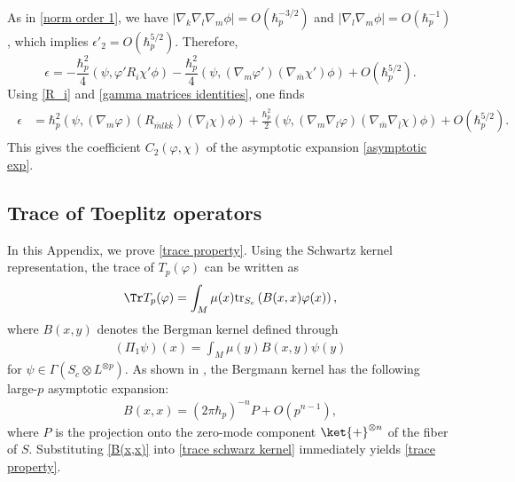 \documentclass[12pt]{article}
\newcommand\eq[1]{\begin{equation}#1\end{equation}}
\newcommand\als[1]{\begin{align}\begin{split}#1\end{split}\end{align}}
\theoremstyle{definition} %
\theoremstyle{plain} %
\theoremstyle{remark} %
\theoremstyle{underline}
\begin{document}
As in \eqref{norm order 1}, we have
$|\nabla_k \nabla_l \nabla_m \phi|= O(\hbar_p^{-3/2})$ and
$|\nabla_l \nabla_m \phi|= O(\hbar_p^{-1})$, which implies
$\epsilon'_2 = O(\hbar_p^{5/2})$.
Therefore,
\eq{
    \epsilon = - \frac{\hbar_p^2}{4}(\psi, \varphi' R_i\chi' \phi) -\frac{\hbar_p^2}{4} (\psi, (\nabla_m \varphi') (\nabla_{\bar m} \chi') \phi) + O(\hbar_p^{5/2}).
}
Using \eqref{R_i} and \eqref{gamma matrices identities}, one finds
\als{
    \epsilon &= \hbar_p^2 (\psi,  (\nabla_m \varphi) ( R_{\bar{m} l k\bar{k}}) (\nabla_{\bar l} \chi) \phi) + \frac{\hbar_p^2}{2} (\psi, (\nabla_m \nabla_l \varphi) (\nabla_{\bar m} \nabla_{\bar l} \chi) \phi) + O(\hbar_p^{5/2}).
}
This gives the coefficient $C_2(\varphi,\chi)$ of the asymptotic expansion
\eqref{asymptotic exp}.




\subsection{Trace of Toeplitz operators}
\label{trace}


In this Appendix, we prove \eqref{trace property}.
Using the Schwartz kernel representation, the trace of $T_p(\varphi)$ can be
written as
\begin{align}
\label{trace schwarz kernel}
\Tr T_p(\varphi) = \int_M \mu(x) \mathrm{tr}_{S_c} \left( B(x,x) \varphi(x)\right),
\end{align}
where $B(x,y)$ denotes the Bergman kernel defined through
\begin{align}
(\Pi_1 \psi) (x) = \int_M \mu(y) B(x,y) \psi(y)
\end{align}
for $\psi \in \Gamma(S_c \otimes L^{\otimes p})$.
As shown in \cite{asym}, the Bergmann kernel has the following large-$p$
asymptotic expansion:
\begin{align}
\label{B(x,x)}
B(x,x) = (2\pi \hbar_p)^{-n} P + O(p^{n-1}),
\end{align}
where $P$ is the projection onto the zero-mode component $\ket{+}^{\otimes n}$ of
the fiber of $S$.
Substituting \eqref{B(x,x)} into \eqref{trace schwarz kernel} immediately yields
\eqref{trace property}.





\end{document}
